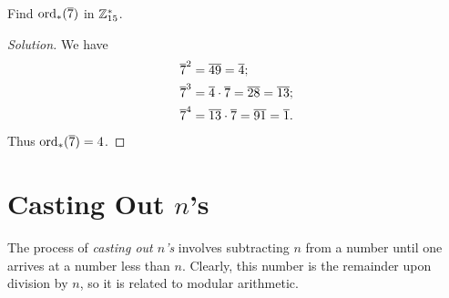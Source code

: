 \documentclass{amsart}
\begin{document}
\begin{Exm}
Find $\text{\rm{ord}}_*(\overline{7})$ in $\mathbb{Z}_{15}^*$.
\end{Exm}

\begin{proof}[Solution]
We have
\begin{align*}
    \overline{7}^2 &= \overline{49} = \overline{4} ; \\
    \overline{7}^3 &= \overline{4} \cdot \overline{7} = \overline{28} = \overline{13} ; \\
    \overline{7}^4 &= \overline{13} \cdot \overline{7} = \overline{91} = \overline{1} .
\end{align*}
Thus $\text{\rm{ord}}_*(\overline{7}) = 4$.
\end{proof}

\begin{comment}
\newpage

\begin{Prop} \BOLD{(Euler's Theorem)} \\
Let $a,n \in \bZ$ with $n \ge 2$ and $\gcd(a,n) = 1$.
Then
\[ a^{\phi(n)} \equiv 1 \MOD{n} . \]
\end{Prop}

\begin{proof}
This is equivalent to showing that $\BAR{a}^{\phi(n)} = \BAR{1}$.
Since $\gcd(a,n) = 1$, $\BAR{a}$ is invertible and $\BAR{a} \in \bZ_n^*$.

Consider the function $f :\bN \to \bZ_n^*$ given by $f(i) = \BAR{a}^i$.
Since $\bN$ is infinite and $\bZ_n^*$ is finite, this function cannot be injective;
let $j$ be the smallest positive integer such that $f(j) = f(k)$ for some $k > j$.
Then $\BAR{a}^j = \BAR{a}^k$, and since $\BAR{a}$ is invertible, so is $\BAR{a}^{j}$,
with inverse $\BAR{a}^{-j}$.
Thus $\BAR{a}^{k-j} = \BAR{1}$.

Consider the function $\alpha : \bZ_n^* \to \bZ_n^*$ given by $\alpha(\BAR{x}) = \BAR{a}\BAR{x}$.
This function has an inverse $\BAR{x} \mapsto \BAR{a}^{-1} \BAR{x}$,
so it is bijective.
\end{comment}

\newpage

\section{Casting Out $n$'s}

The process of {\em casting out $n$'s} involves subtracting $n$ from a number
until one arrives at a number less than $n$.  Clearly, this number is the remainder
upon division by $n$, so it is related to modular arithmetic.
\end{document}
